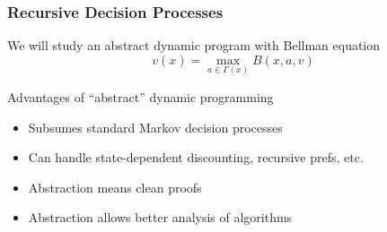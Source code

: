 \begin{frame}
    \frametitle{Recursive Decision Processes}

    We will study an abstract dynamic program with Bellman equation
    \begin{equation*}
        v(x) = \max_{a \in \Gamma(x)} B(x, a, v)
    \end{equation*}

        \vspace{0.5em}
        \vspace{0.5em}
    Advantages of ``abstract'' dynamic programming

    \begin{itemize}
        \item Subsumes standard Markov decision processes
        \vspace{0.5em}
        \item Can handle state-dependent discounting, recursive prefs, etc.
        \vspace{0.5em}
        \item Abstraction means clean proofs
        \vspace{0.5em}
        \item Abstraction allows better analysis of algorithms
    \end{itemize}

\end{frame}


